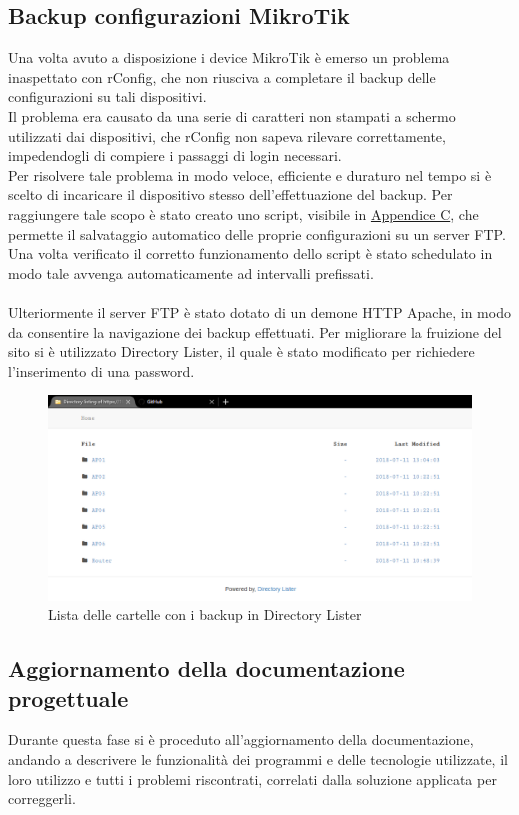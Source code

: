 \documentclass[Realizzazione.tex]{subfiles}
\begin{document}
\subsection{Backup configurazioni MikroTik}
Una volta avuto a disposizione i device MikroTik è emerso un problema inaspettato con rConfig, che non riusciva a completare il backup delle configurazioni su tali dispositivi. \\
Il problema era causato da una serie di caratteri non stampati a schermo utilizzati dai dispositivi, che rConfig non sapeva rilevare correttamente, impedendogli di compiere i passaggi di login necessari. \\
Per risolvere tale problema in modo veloce, efficiente e duraturo nel tempo si è scelto di incaricare il dispositivo stesso dell'effettuazione del backup. Per raggiungere tale scopo è stato creato uno script, visibile in \hyperref[sec:Appendice C]{Appendice C}, che permette il salvataggio automatico delle proprie configurazioni su un server FTP. \\
Una volta verificato il corretto funzionamento dello script è stato schedulato in modo tale avvenga automaticamente ad intervalli prefissati. \\\\
Ulteriormente il server FTP è stato dotato di un demone HTTP Apache, in modo da consentire la navigazione dei backup effettuati. Per migliorare la fruizione del sito si è utilizzato Directory Lister, il quale è stato modificato per richiedere l'inserimento di una password. \\

\begin{figure}[H]
	\centering
	\includegraphics[width=1\linewidth]{"images/DirectoryLister"}
	\caption{Lista delle cartelle con i backup in Directory Lister}
	\label{fig:Lista delle cartelle con i backup in Directory Lister}
\end{figure}


\subsection{Aggiornamento della documentazione progettuale}
Durante questa fase si è proceduto all'aggiornamento della documentazione, andando a descrivere le funzionalità dei programmi e delle tecnologie utilizzate, il loro utilizzo e tutti i problemi riscontrati, correlati dalla soluzione applicata per correggerli.
	
\end{document}

